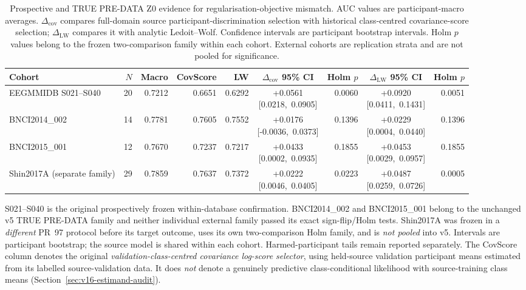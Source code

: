 \begin{table}[t]
\centering
\caption{Prospective and TRUE PRE-DATA Z0 evidence for regularisation-objective mismatch. AUC values are participant-macro averages. $\Delta_{\mathrm{cov}}$ compares full-domain source participant-discrimination selection with historical class-centred covariance-score selection; $\Delta_{\mathrm{LW}}$ compares it with analytic Ledoit--Wolf. Confidence intervals are participant bootstrap intervals. Holm $p$ values belong to the frozen two-comparison family within each cohort. External cohorts are replication strata and are not pooled for significance.}
\label{tab:main-prospective-results}
\scriptsize
\setlength{\tabcolsep}{3.2pt}
\renewcommand{\arraystretch}{1.12}
\begin{tabular}{lrrrrcrcr}
\toprule
Cohort & $N$ & Macro & CovScore & LW &
\shortstack{$\Delta_{\mathrm{cov}}$\\95\% CI} &
Holm $p$ &
\shortstack{$\Delta_{\mathrm{LW}}$\\95\% CI} &
Holm $p$ \\
\midrule
EEGMMIDB S021--S040
& 20 & 0.7212 & 0.6651 & 0.6292
& \shortstack{+0.0561\\\mbox{[0.0218, 0.0905]}}
& 0.0060
& \shortstack{+0.0920\\\mbox{[0.0411, 0.1431]}}
& 0.0051 \\
BNCI2014\_002
& 14 & 0.7781 & 0.7605 & 0.7552
& \shortstack{+0.0176\\\mbox{[-0.0036, 0.0373]}}
& 0.1396
& \shortstack{+0.0229\\\mbox{[0.0004, 0.0440]}}
& 0.1396 \\
BNCI2015\_001
& 12 & 0.7670 & 0.7237 & 0.7217
& \shortstack{+0.0433\\\mbox{[0.0002, 0.0935]}}
& 0.1855
& \shortstack{+0.0453\\\mbox{[0.0029, 0.0957]}}
& 0.1855 \\
Shin2017A (separate family)
& 29 & 0.7859 & 0.7637 & 0.7372
& \shortstack{+0.0222\\\mbox{[0.0046, 0.0405]}}
& 0.0223
& \shortstack{+0.0487\\\mbox{[0.0259, 0.0726]}}
& 0.0005 \\
\bottomrule
\end{tabular}

\vspace{1mm}
\footnotesize
S021--S040 is the original prospectively frozen within-database confirmation. BNCI2014\_002 and BNCI2015\_001 belong to the unchanged v5 TRUE PRE-DATA family and neither individual external family passed its exact sign-flip/Holm tests. Shin2017A was frozen in a \emph{different} PR~97 protocol before its target outcome, uses its own two-comparison Holm family, and is \emph{not pooled} into v5. Intervals are participant bootstrap; the source model is shared within each cohort. Harmed-participant tails remain reported separately. The CovScore column denotes the original \emph{validation-class-centred covariance log-score selector}, using held-source validation participant means estimated from its labelled source-validation data. It does \emph{not} denote a genuinely predictive class-conditional likelihood with source-training class means (Section~\ref{sec:v16-estimand-audit}).
\end{table}

